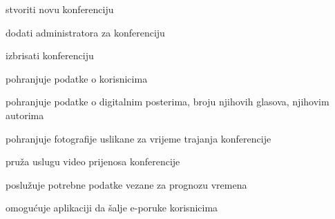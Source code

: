\begin{packed_enum}
\begin{packed_enum}
				\end{packed_enum}
				
				\item {}
				
				\begin{packed_enum}
				
					\item stvoriti novu konferenciju
					\item dodati administratora za konferenciju
					\item izbrisati konferenciju
				
				\end{packed_enum}
				
				\item {}
				
				\begin{packed_enum}
					
					\item pohranjuje podatke o korisnicima
					\item pohranjuje podatke o digitalnim posterima, broju njihovih glasova, njihovim autorima
					\item pohranjuje fotografije uslikane za vrijeme trajanja konferencije
					
				\end{packed_enum}
				
				\item {}
				
				\begin{packed_enum}
					
					\item pruža uslugu video prijenosa konferencije
				
				\end{packed_enum}
				
				\item {}
				
				\begin{packed_enum}
					
					\item poslužuje potrebne podatke vezane za prognozu vremena
					
				\end{packed_enum}
				
				\item {}
				
				\begin{packed_enum}
					
					\item omogućuje aplikaciji da šalje e-poruke korisnicima
					
				\end{packed_enum}
				
			\end{packed_enum}
			
